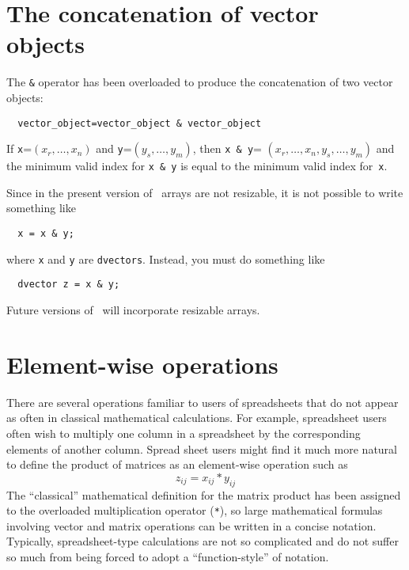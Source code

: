 \documentclass{admbmanual}
\begin{document}
\section{The concatenation of vector objects}

 
The \texttt{\&} operator has been overloaded to produce the concatenation of two
vector objects:
\begin{lstlisting}
  vector_object=vector_object & vector_object
\end{lstlisting}
If \texttt{x}=$(x_r,\ldots,x_n)$ and \texttt{y}=$(y_s,\ldots,y_m)$, then
\texttt{x \& y}= $(x_r,\ldots,x_n,y_s,\ldots,y_m)$ and the minimum valid index
for \texttt{x \& y} is equal to the minimum valid index for~\texttt{x}.

Since in the present version of \scAD\ arrays are not resizable, it is not
possible to write something like 
\begin{lstlisting}
  x = x & y;
\end{lstlisting}
where \texttt{x} and \texttt{y} are \texttt{dvectors}. Instead, you must do
something like
\begin{lstlisting}
  dvector z = x & y;
\end{lstlisting}

Future versions of \scAD\ will incorporate resizable arrays.

\section{Element-wise operations}

There are several operations familiar to users of spreadsheets that do not
appear as often in classical mathematical calculations. For example, spreadsheet
users often wish to multiply one column in a spreadsheet by the corresponding
elements of another column. Spread sheet users might find it much more natural
to define the product of matrices as an element-wise operation such as
\begin{equation*}
  z_{ij}= x_{ij}*y_{ij}
\end{equation*}
The ``classical'' mathematical definition for the matrix product has been
assigned to the overloaded multiplication operator (\texttt{*}), so large
mathematical formulas involving vector and matrix operations can be written in a
concise notation. Typically, spreadsheet-type calculations are not so
complicated and do not suffer so much from being forced to adopt a
``function-style'' of notation.
\end{document}
